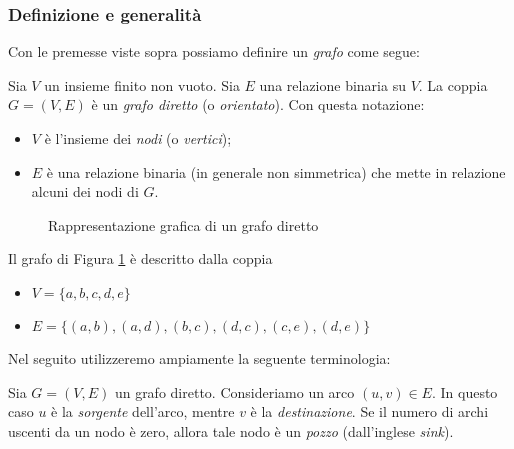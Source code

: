 \subsubsection{Definizione e generalità}
Con le premesse viste sopra possiamo definire un \emph{grafo} come segue:
\begin{definition}
    Sia $V$ un insieme finito non vuoto. Sia $E$ una relazione binaria su $V$. La coppia $G = (V, E)$ è un \emph{grafo diretto} (o \emph{orientato}). Con questa notazione:
    \begin{itemize}
        \item $V$ è l'insieme dei \emph{nodi} (o \emph{vertici});
        \item $E$ è una relazione binaria (in generale non simmetrica) che mette in relazione alcuni dei nodi di $G$.
    \end{itemize}
\end{definition}
\begin{example}
    \begin{figure}[t]
        \centering
        \caption{Rappresentazione grafica di un grafo diretto}
        \label{fig:graph}
    \end{figure}
    Il grafo di Figura \ref{fig:graph} è descritto dalla coppia
    \begin{itemize}
        \item $V = \{a,b,c,d,e\}$
        \item $E = \{(a,b), (a,d), (b,c), (d,c), (c,e), (d,e)\}$
    \end{itemize}
\end{example}
Nel seguito utilizzeremo ampiamente la seguente terminologia:
\begin{definition}
    Sia $G = (V,E)$ un grafo diretto. Consideriamo un arco $(u,v) \in E$. In questo caso $u$ è la \emph{sorgente} dell'arco, mentre $v$ è la \emph{destinazione}. Se il numero di archi uscenti da un nodo è zero, allora tale nodo  è un \emph{pozzo} (dall'inglese \emph{sink}).
\end{definition}

